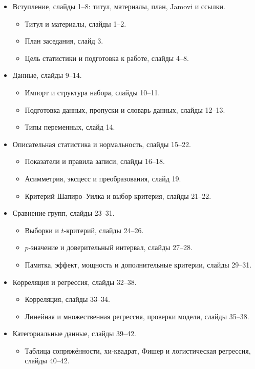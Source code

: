 \documentclass[11pt,a4paper]{article}
\begin{document}
\begin{itemize}
\item Вступление, слайды 1--8: титул, материалы, план, Jamovi и ссылки.
  \begin{itemize}
    \item Титул и материалы, слайды 1--2.
    \item План заседания, слайд 3.
    \item Цель статистики и подготовка к работе, слайды 4--8.
  \end{itemize}
\item Данные, слайды 9--14.
  \begin{itemize}
    \item Импорт и структура набора, слайды 10--11.
    \item Подготовка данных, пропуски и словарь данных, слайды 12--13.
    \item Типы переменных, слайд 14.
  \end{itemize}
\item Описательная статистика и нормальность, слайды 15--22.
  \begin{itemize}
    \item Показатели и правила записи, слайды 16--18.
    \item Асимметрия, эксцесс и преобразования, слайд 19.
    \item Критерий Шапиро--Уилка и выбор критерия, слайды 21--22.
  \end{itemize}
\item Сравнение групп, слайды 23--31.
  \begin{itemize}
    \item Выборки и $t$-критерий, слайды 24--26.
    \item $p$-значение и доверительный интервал, слайды 27--28.
    \item Памятка, эффект, мощность и дополнительные критерии, слайды 29--31.
  \end{itemize}
\item Корреляция и регрессия, слайды 32--38.
  \begin{itemize}
    \item Корреляция, слайды 33--34.
    \item Линейная и множественная регрессия, проверки модели, слайды 35--38.
  \end{itemize}
\item Категориальные данные, слайды 39--42.
  \begin{itemize}
    \item Таблица сопряжённости, хи-квадрат, Фишер и логистическая регрессия, слайды 40--42.

\end{itemize}
\end{itemize}
\end{document}
